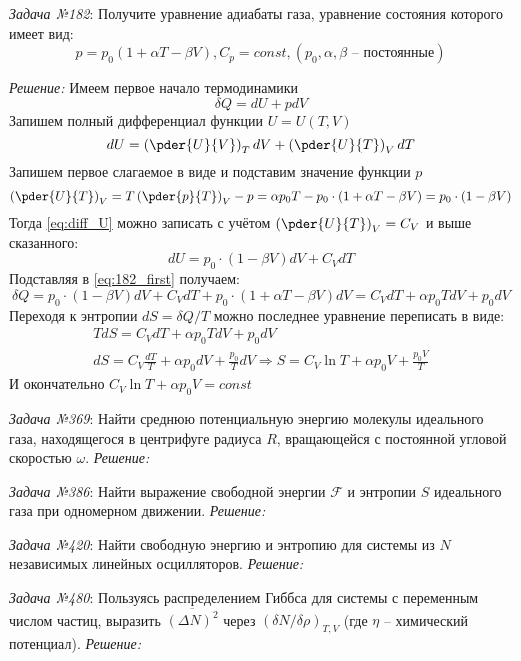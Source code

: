 \documentclass[14pt,final,titlepage,pscyr]{hedwork}
\begin{document}
\emph{Задача №182}: Получите уравнение адиабаты газа, уравнение состояния 
которого имеет вид:
\[
	p = p_0\left( 1 + \alpha T - \beta V \right), C_p = const, 
	(p_0, \alpha, \beta \text{ -- постоянные})
\]

\emph{Решение:}
Имеем первое начало термодинамики 
\begin{equation}
	\delta Q = dU + pdV
	\label{eq:182_first}
\end{equation}
Запишем полный дифференциал функции \( U = U(T,V) \)
\begin{equation}
	dU = \left( \pder{U}{V} \right)_T dV + \left( \pder{U}{T} \right)_V dT
	\label{eq:diff_U}
\end{equation}
Запишем первое слагаемое в виде и подставим значение функции \( p \)
\[
	\left( \pder{U}{T} \right)_V = T\left( \pder{p}{T} \right)_V - p = 
		\alpha p_0 T - p_0 \cdot (1+\alpha T-\beta V) = p_0\cdot(1-\beta V)
\]
Тогда \eqref{eq:diff_U} можно записать с учётом 
\( \left( \pder{U}{T} \right)_V = C_V \) и выше сказанного:
\[
	dU = p_0\cdot(1-\beta V)dV + C_V dT
\]
Подставляя в \eqref{eq:182_first} получаем:
\[
	\delta Q = p_0\cdot(1-\beta V)dV + C_V dT + 
		p_0\cdot(1+\alpha T-\beta V)dV = C_V dT + \alpha p_0 T dV + p_0 dV
\]
Переходя к энтропии \( dS = \delta Q / T \) можно последнее уравнение 
переписать в виде:
\begin{gather}
	TdS = C_V dT + \alpha p_0 T dV + p_0 dV \nonumber \\
	dS = C_V \frac{dT}{T} + \alpha p_0 dV + \frac{p_0}{T} dV \Rightarrow 
	S = C_V\ln T + \alpha p_0 V + \frac{p_0 V}{T}
\end{gather}
И окончательно \( C_V \ln T + \alpha p_0 V = const \)
\newpage

\emph{Задача №369}: Найти среднюю потенциальную энергию молекулы идеального 
газа, находящегося в центрифуге радиуса \( R \), вращающейся с постоянной 
угловой скоростью \( \omega \).
\emph{Решение:}
\newpage

\emph{Задача №386}: Найти выражение свободной энергии \( \mathcal{F} \) и 
энтропии \( S \) идеального газа при одномерном движении.
\emph{Решение:}
\newpage

\emph{Задача №420}: Найти свободную энергию и энтропию для системы из \( N \) 
независимых линейных осцилляторов.
\emph{Решение:}
\newpage

\emph{Задача №480}: Пользуясь распределением Гиббса для системы с переменным 
числом частиц, выразить \( \overline{(\Delta N)^2} \) через 
\( \left( \delta N / \delta \rho \right)_{T,V} \) (где \( \eta \) -- 
химический потенциал).
\emph{Решение:}
\newpage
\end{document}
